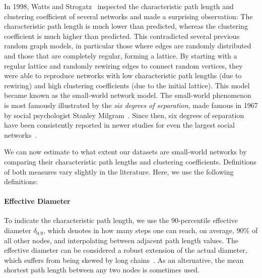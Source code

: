 \documentclass[11pt,a4paper]{book}
\begin{document}
In 1998, Watts and Strogatz~\cite{b228} inspected the characteristic
path length and  
clustering coefficient of several networks and made a surprising
observation:  The characteristic path length is much lower than
predicted, whereas
the clustering coefficient is much higher than predicted.  This
contradicted several previous random graph models, in particular those
where edges are randomly distributed and those that are completely
regular, forming a lattice.  By starting with a regular lattice and
randomly rewiring edges to connect random vertices, they were able to
reproduce networks with low characteristic path lengths (due to rewiring) and high
clustering coefficients (due to the initial lattice).  This model became
known as the small-world network model. 
The small-world phenomenon is most famously 
illustrated by the \emph{six degrees of separation}, made famous in
1967 by social psychologist Stanley Milgram~\cite{b567,b568}. 
Since then, six degrees of separation have been consistently reported in newer
studies for even the largest social networks~\cite{b418}.  

We can now estimate to what extent our datasets are small-world networks by
comparing their characteristic path lengths and clustering coefficients. 
Definitions of both measures vary slightly in the literature.
Here, we use the following definitions:

\paragraph{Effective Diameter}
\label{para:effective-diameter}
To indicate the characteristic path length, we use the 90-percentile
effective diameter $\delta_{0.9}$, which denotes in how many steps one can reach,
on average, 90\% of all other nodes, and interpolating between adjacent
path length values.  The effective diameter can be considered a robust
extension of the actual diameter, which suffers from being skewed by
long chains~\cite{b242}.  
As an alternative, the mean shortest path
length between any two nodes is sometimes used.  
\end{document}
